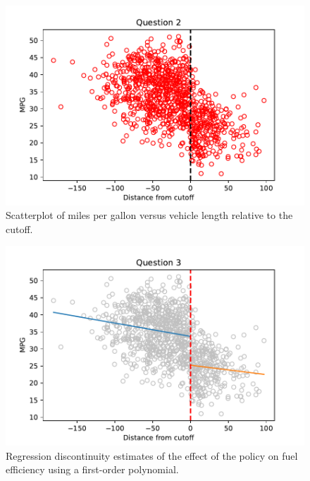 \documentclass{article}
\begin{document}
\clearpage

\begin{figure}[ht]
\centering
\includegraphics{hw7q2.pdf}
\caption{Scatterplot of miles per gallon versus vehicle length relative to the cutoff.}
\label{fig:hw7q2}
\end{figure}

\begin{figure}[ht]
\centering
\includegraphics{hw7q3.pdf}
\caption{Regression discontinuity estimates of the effect of the policy on fuel efficiency using a first-order polynomial.}
\label{fig:hw7q3}
\end{figure}
\end{document}
